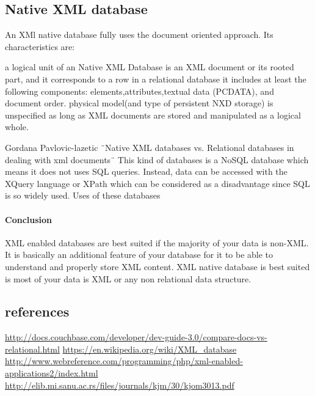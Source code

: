 \subsection{Native XML database}

An XMl native database fully uses the document oriented approach. Its characteristics are:

    a logical unit of an Native XML Database is an XML document or its rooted part, and it corresponds to a row in a relational database
    it includes at least the following components: elements,attributes,textual data (PCDATA), and document order.
    physical model(and type of persistent NXD storage) is unspecified as long as XML documents are stored and manipulated as a logical whole.

Gordana Pavlovic-lazetic ¨Native XML databases vs. Relational databases in dealing with xml documents¨
This kind of databases is a NoSQL database which means it does not uses SQL queries. Instead, data can be accessed with the XQuery language or XPath which can be considered as a disadvantage since SQL is so widely used.
Uses of these databases


\paragraph{Conclusion}
XML enabled databases are best suited if the majority of your data is non-XML. It is basically an additional feature of your database for it to be able to understand and properly store XML content. XML native database is best suited is most of your data is XML or any non relational data structure.
\subsection{references}


\url{http://docs.couchbase.com/developer/dev-guide-3.0/compare-docs-vs-relational.html}
\url{ https://en.wikipedia.org/wiki/XML_database}
\url{ http://www.webreference.com/programming/php/xml-enabled-applications2/index.html}
\url{ http://elib.mi.sanu.ac.rs/files/journals/kjm/30/kjom3013.pdf}


